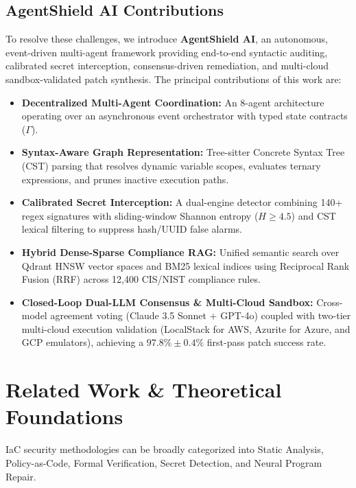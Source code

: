 \documentclass[runningheads]{llncs}
\begin{document}
\subsection{AgentShield AI Contributions}
To resolve these challenges, we introduce \textbf{AgentShield AI}, an autonomous, event-driven multi-agent framework providing end-to-end syntactic auditing, calibrated secret interception, consensus-driven remediation, and multi-cloud sandbox-validated patch synthesis. The principal contributions of this work are:
\begin{itemize}
    \item \textbf{Decentralized Multi-Agent Coordination:} An 8-agent architecture operating over an asynchronous event orchestrator with typed state contracts ($\Gamma$).
    \item \textbf{Syntax-Aware Graph Representation:} Tree-sitter Concrete Syntax Tree (CST) parsing that resolves dynamic variable scopes, evaluates ternary expressions, and prunes inactive execution paths.
    \item \textbf{Calibrated Secret Interception:} A dual-engine detector combining 140+ regex signatures with sliding-window Shannon entropy ($H \ge 4.5$) and CST lexical filtering to suppress hash/UUID false alarms.
    \item \textbf{Hybrid Dense-Sparse Compliance RAG:} Unified semantic search over Qdrant HNSW vector spaces and BM25 lexical indices using Reciprocal Rank Fusion (RRF) across 12,400 CIS/NIST compliance rules.
    \item \textbf{Closed-Loop Dual-LLM Consensus \& Multi-Cloud Sandbox:} Cross-model agreement voting (Claude 3.5 Sonnet + GPT-4o) coupled with two-tier multi-cloud execution validation (LocalStack for AWS, Azurite for Azure, and GCP emulators), achieving a $97.8\% \pm 0.4\%$ first-pass patch success rate.
\end{itemize}


\section{Related Work \& Theoretical Foundations}
IaC security methodologies can be broadly categorized into Static Analysis, Policy-as-Code, Formal Verification, Secret Detection, and Neural Program Repair.
\end{document}
